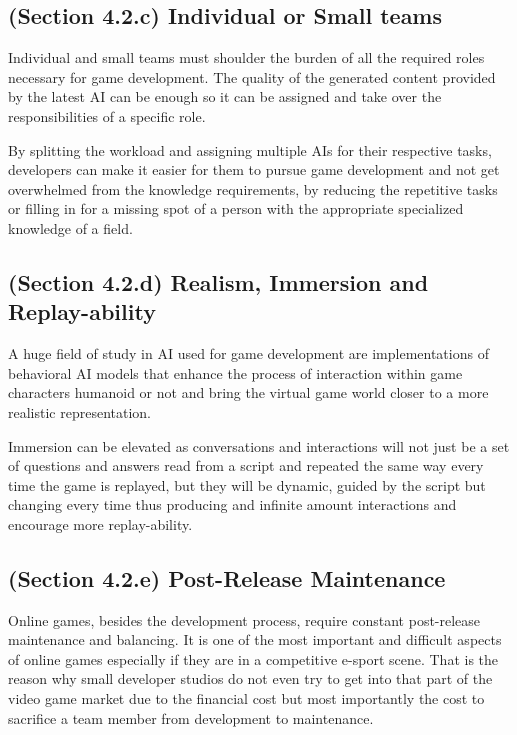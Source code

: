 \documentclass[a4paper,one side,12pt]{book}
\begin{document}
\subsection{(Section 4.2.c) Individual or Small teams}

Individual and small teams must shoulder the burden of all the required
roles necessary for game development. The quality of the generated
content provided by the latest AI can be enough so it can be assigned
and take over the responsibilities of a specific role.

By splitting the workload and assigning multiple AIs for their
respective tasks, developers can make it easier for them to pursue game
development and not get overwhelmed from the knowledge requirements, by
reducing the repetitive tasks or filling in for a missing spot of a
person with the appropriate specialized knowledge of a field.

\subsection{(Section 4.2.d) Realism, Immersion and Replay-ability}

A huge field of study in AI used for game development are
implementations of behavioral AI models that enhance the process of
interaction within game characters humanoid or not and bring the virtual
game world closer to a more realistic representation.

Immersion can be elevated as conversations and interactions will not
just be a set of questions and answers read from a script and repeated
the same way every time the game is replayed, but they will be dynamic,
guided by the script but changing every time thus producing and infinite
amount interactions and encourage more replay-ability.

\subsection{(Section 4.2.e) Post-Release Maintenance}

Online games, besides the development process, require constant
post-release maintenance and balancing. It is one of the most important
and difficult aspects of online games especially if they are in a
competitive e-sport scene. That is the reason why small developer
studios do not even try to get into that part of the video game market
due to the financial cost but most importantly the cost to sacrifice a
team member from development to maintenance.
\end{document}
